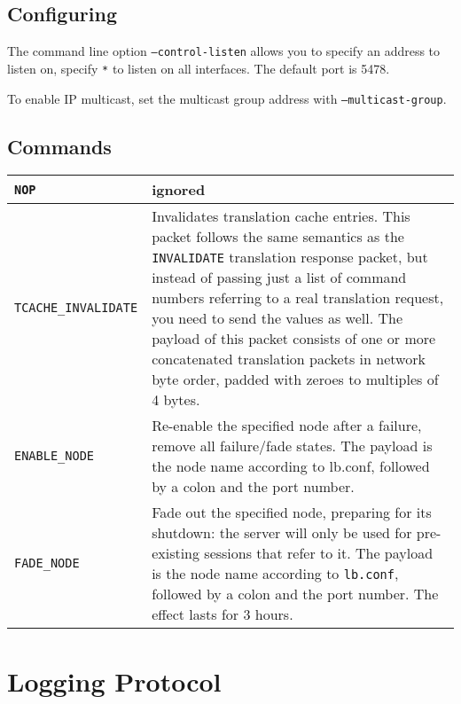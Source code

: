 \documentclass[a4paper,12pt]{article}
\begin{document}
\subsection{Configuring}

The command line option \texttt{--control-listen} allows you to
specify an address to listen on, specify \texttt{*} to listen on all
interfaces.  The default port is 5478.

To enable IP multicast, set the multicast group address with
\texttt{--multicast-group}.

\subsection{Commands}

\begin{longtable}{|l|p{8cm}|}
\hline

\texttt{NOP} & ignored \\

\hline

\verb|TCACHE_INVALIDATE| & Invalidates translation cache entries.
This packet follows the same semantics as the \verb|INVALIDATE|
translation response packet, but instead of passing just a list of
command numbers referring to a real translation request, you need to
send the values as well.  The payload of this packet consists of one
or more concatenated translation packets in network byte order, padded
with zeroes to multiples of 4 bytes.  \\

\hline

\verb|ENABLE_NODE| & Re-enable the specified node after a failure,
remove all failure/fade states.  The payload is the node name
according to lb.conf, followed by a colon and the port number. \\

\hline

\verb|FADE_NODE| & Fade out the specified node, preparing for its
shutdown: the server will only be used for pre-existing sessions that
refer to it.  The payload is the node name according to
\texttt{lb.conf}, followed by a colon and the port number.  The effect
lasts for 3 hours. \\

\hline
\end{longtable}


\section{Logging Protocol}
\end{document}

